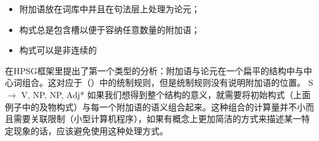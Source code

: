 \begin{itemize}
\item 附加语放在词库中\citep*{NB94,BMS2001a}并且在句法层上处理为论元；
\item 构式总是包含槽以便于容纳任意数量的附加语；
\item 构式可以是非连续的
\end{itemize}
 \citet{Kasper94a}在HPSG框架里提出了第一个类型的分析：附加语与论元在一个扁平的结构中与中心词组合。这对应于（）中的统制规则，但是统制规则没有说明附加语的位置。
\ea
S $\to$ V, NP, NP, Adj*
\z
如果我们想得到整个结构的意义，就需要将初始构式（上面例子中的及物构式）与每一个附加语的语义组合起来。这种组合的计算量并不小而且需要关联限制（小型计算机程序），如果有概念上更加简洁的方式来描述某一特定现象的话，应该避免使用这种处理方式。

